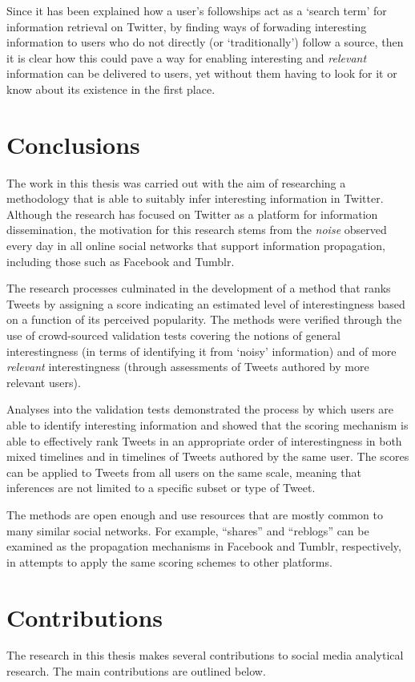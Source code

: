 Since it has been explained how a user's followships act as a `search term' for information retrieval on Twitter, by finding ways of forwading interesting information to users who do not directly (or `traditionally') follow a source, then it is clear how this could pave a way for enabling interesting and \textit{relevant} information can be delivered to users, yet without them having to look for it or know about its existence in the first place.


\section{Conclusions}
The work in this thesis was carried out with the aim of researching a methodology that is able to suitably infer interesting information in Twitter. Although the research has focused on Twitter as a platform for information dissemination, the motivation for this research stems from the \textit{noise} observed every day in all online social networks that support information propagation, including those such as Facebook and Tumblr.

The research processes culminated in the development of a method that ranks Tweets by assigning a score indicating an estimated level of interestingness based on a function of its perceived popularity. The methods were verified through the use of crowd-sourced validation tests covering the notions of general interestingness (in terms of identifying it from `noisy' information) and of more \textit{relevant} interestingness (through assessments of Tweets authored by more relevant users).

Analyses into the validation tests demonstrated the process by which users are able to identify interesting information and showed that the scoring mechanism is able to effectively rank Tweets in an appropriate order of interestingness in both mixed timelines and in timelines of Tweets authored by the same user. The scores can be applied to Tweets from all users on the same scale, meaning that inferences are not limited to a specific subset or type of Tweet.

The methods are open enough and use resources that are mostly common to many similar social networks. For example, ``shares'' and ``reblogs'' can be examined as the propagation mechanisms in Facebook and Tumblr, respectively, in attempts to apply the same scoring schemes to other platforms.


\section{Contributions}
The research in this thesis makes several contributions to social media analytical research. The main contributions are outlined below.

